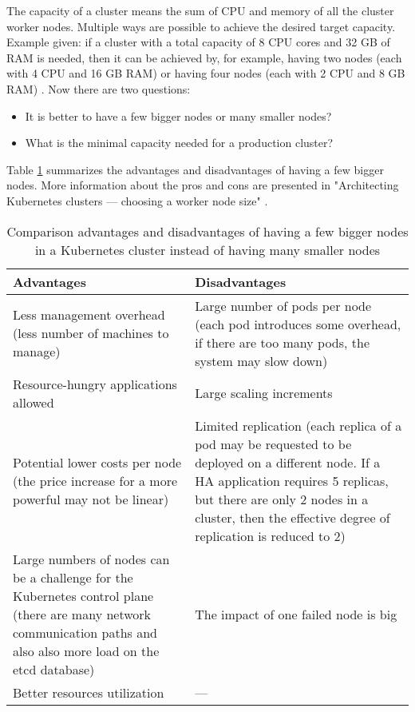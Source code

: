 The capacity of a cluster means the sum of CPU and memory of all the cluster worker nodes. Multiple ways are possible to achieve the desired target capacity. Example given: if a cluster with a total capacity of 8 CPU cores and 32 GB of RAM is needed, then it can be achieved by, for example, having two nodes (each with 4 CPU and 16 GB RAM) or having four nodes (each with 2 CPU and 8 GB RAM) \cite{kubernetes-node-size}. Now there are two questions:
\begin{itemize}
\item It is better to have a few bigger nodes or many smaller nodes?
\item What is the minimal capacity needed for a production cluster?
\end{itemize}

Table \ref{tab:pros-cons-large-nodes} summarizes the advantages and disadvantages of having a few bigger nodes. More information about the pros and cons are presented in "Architecting Kubernetes clusters — choosing a worker node size" \cite{kubernetes-node-size}.

\begin{table}[H]
\captionsetup{justification=centering}
\caption{\label{tab:pros-cons-large-nodes}Comparison advantages and disadvantages of having a few bigger nodes in a Kubernetes cluster instead of having many smaller nodes \cite{kubernetes-node-size}}
\begin{tabularx}{1\textwidth} {
  | >{\centering\arraybackslash}X
  | >{\centering\arraybackslash}X | }
 \hline
  \textbf{Advantages} & \textbf{Disadvantages}  \\
 \hline
 Less management overhead (less number of machines to manage)  & Large number of pods per node (each pod introduces some overhead, if there are too many pods, the system may slow down)   \\
 \hline
 Resource-hungry applications allowed  & Large scaling increments  \\
 \hline
  Potential lower costs per node (the price increase for a more powerful may not be linear)  & Limited replication (each replica of a pod may be requested to be deployed on a different node. If a HA application requires 5 replicas, but there are only 2 nodes in a cluster, then the effective degree of replication is reduced to 2)  \\
 \hline
  Large numbers of nodes can be a challenge for the Kubernetes control plane (there are many network communication paths and also also more load on the etcd database) & The impact of one failed node is big   \\
 \hline
  Better resources utilization & ---  \\
 \hline
\end{tabularx}
\end{table}

